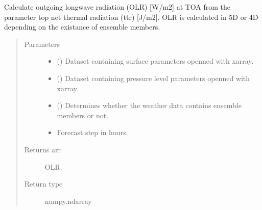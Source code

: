 \documentclass[a4paper,11pt,english]{sphinxmanual}
\begin{document}

\begin{fulllineitems}
\label{\detokenize{modules:envlib.processing_surf_vars.get_olr}}
Calculate outgoing longwave radiation (OLR) {[}W/m2{]} at TOA from the parameter top net thermal radiation (ttr)
{[}J/m2{]}. OLR is calculated in 5D or 4D depending on the existance of ensemble members.
\begin{quote}\begin{description}
\item[{Parameters}] \leavevmode\begin{itemize}
\item {} 
 () \textendash{} Dataset containing surface parameters openned with xarray.

\item {} 
 () \textendash{} Dataset containing pressure level parameters openned with xarray.

\item {} 
 () \textendash{} Determines whether the weather data contains ensemble members or not.

\item {} 
 \textendash{} Forecast step in hours.

\end{itemize}

\item[{Returns arr}] \leavevmode
OLR.

\item[{Return type}] \leavevmode
numpy.ndarray

\end{description}\end{quote}

\end{fulllineitems}
\end{document}
